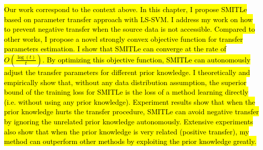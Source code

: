 \hl{Our work correspond to the context above. In this chapter, I propose SMITLe based on parameter transfer approach with LS-SVM. I address my work on how to prevent negative transfer when the source data is not accessible. Compared to other works, I propose a novel strongly convex objective function for transfer parameters estimation. I show that SMITLe can converge at the rate of $O(\frac{\log(t)}{t})$. 
By optimizing this objective function, SMITLe can autonomously adjust the transfer parameters for different prior knowledge. I theoretically and empirically show that, without any data distribution assumption, the superior bound of the training loss for SMITLe is the loss of a method learning directly (i.e. without using any prior knowledge). Experiment results show that when the prior knowledge hurts the transfer procedure, SMITLe can avoid negative transfer by ignoring the unrelated prior knowledge autonomously. Extensive experiments also show that when the prior knowledge is very related (positive transfer), my method can outperform other methods by exploiting the prior knowledge greatly.}
